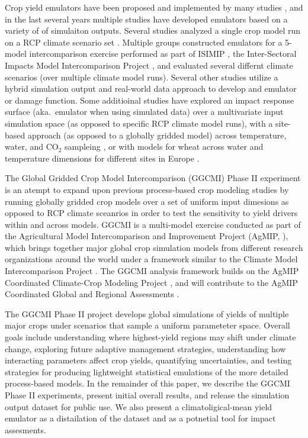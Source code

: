 \documentclass[preprint, 5p, times, twocolumn]{elsarticle}
\begin{document}
Crop yield emulators have been proposed and implemented by many studies \citep[e.g.\ ][]{Howden2005, raisen2006, Lobell2010, Iizumi2010, Ferrise2011, Holzkamper2012, RUANE2013a, Howden2005, Markowski2015}, and in the last several years multiple studies have developed emulators based on a variety of of simulaiton outputs. Several studies analyzed a single crop model run on a RCP climate scenario set \citep[e.g.\ ][]{Oyebamiji15}. Multiple groups constructed emulators for a 5-model intercomparison exercise performed as part of ISIMIP \citep{Warszawski3228}, the Inter-Sectoral Impacts Model Intercomparison Project \citep[e.g.\ ][]{BLANC2015, BLANC2017, Ostberg2018}, and evaluated several differnt climate scenarios (over multiple climate model runs). Several other studies \citep[e.g.\ ][]{Moore2017, Mistry2017} utilize a hybrid simulation output and real-world data approach to develop and emulator or damage function. Some additioinal studies have explored an impact response surface (aka.\ emulator when using simulated data) over a multivariate input simulation space (as opposed to specific RCP climate model runs), with a site-based approach (as opposed to a globally gridded model) across temperature, water, and CO$_2$ sampleing \citep{snyder2018}, or with models for wheat across water and temperature dimensions for different sites in Europe \citep{FRONZEK20182}. 

The Global Gridded Crop Model Intercomparison (GGCMI) Phase II experiment is an atempt to expand upon previous process-based crop modeling studies by running globally gridded crop models over a set of uniform input dimesions as opposed to RCP climate sceanrios in order to test the sensitivity to yield drivers within and across models. GGCMI is a multi-model exercise conducted as part of the Agricultural Model Intercomparison and Improvement Project (AgMIP, \citep{ROSENZWEIG2013, Rosenzweig2014}), which brings together major global crop simulation models from different research organizations around the world under a framework similar to the Climate Model Intercomparison Project \citep[CMIP,~][]{Taylor2012, Eyring2016}. The GGCMI analysis framework builds on the AgMIP Coordinated Climate-Crop Modeling Project \citep[C3MP,~][]{ruane2014, mcdermid2015}, and will contribute to the AgMIP Coordinated Global and Regional Assessments \citep[CGRA,~][]{ruane2018, rosenzweig2018}. 

The GGCMI Phase II project develops global simulations of yields of multiple major crops under scenarios that sample a uniform parameteter space. Overall goals include understanding where highest-yield regions may shift under climate change, exploring future adaptive management strategies, understanding how interacting parameters affect crop yields, quantifying uncertainties, and testing strategies for producing lightweight statistical emulations of the more detailed process-based models. In the remainder of this paper, we describe the GGCMI Phase II experiments, present initial overall results, and release the simulation output dataset for public use. We also present a climatoligical-mean yield emulator as a distailation of the dataset and as a potnetial tool for impact assesments.
\end{document}
